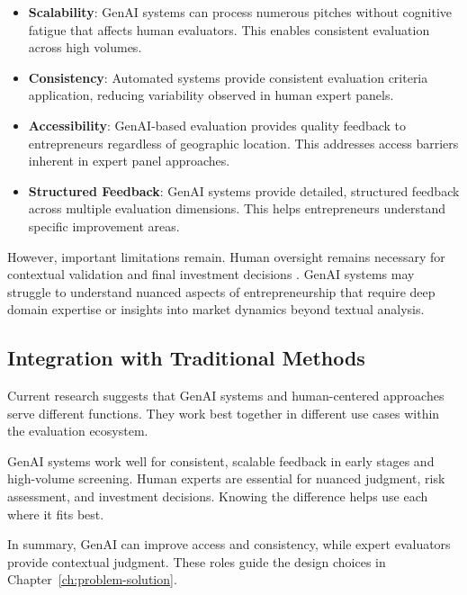 \begin{itemize}
    \item \textbf{Scalability}: GenAI systems can process numerous pitches without cognitive fatigue that affects human evaluators. This enables consistent evaluation across high volumes.

    \item \textbf{Consistency}: Automated systems provide consistent evaluation criteria application, reducing variability observed in human expert panels.

    \item \textbf{Accessibility}: GenAI-based evaluation provides quality feedback to entrepreneurs regardless of geographic location. This addresses access barriers inherent in expert panel approaches.

    \item \textbf{Structured Feedback}: GenAI systems provide detailed, structured feedback across multiple evaluation dimensions. This helps entrepreneurs understand specific improvement areas.
\end{itemize}

However, important limitations remain. Human oversight remains necessary for contextual validation and final investment decisions \cite{Steyvers2024}. GenAI systems may struggle to understand nuanced aspects of entrepreneurship that require deep domain expertise or insights into market dynamics beyond textual analysis.

\subsection{Integration with Traditional Methods}\label{subsec:integration-with-traditional-methods}
Current research suggests that GenAI systems and human-centered approaches serve different functions. They work best together in different use cases within the evaluation ecosystem.

GenAI systems work well for consistent, scalable feedback in early stages and high-volume screening. Human experts are essential for nuanced judgment, risk assessment, and investment decisions. Knowing the difference helps use each where it fits best.

In summary, GenAI can improve access and consistency, while expert evaluators provide contextual judgment. These roles guide the design choices in Chapter~\ref{ch:problem-solution}.


